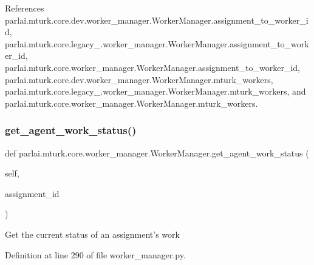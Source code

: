 References parlai.\+mturk.\+core.\+dev.\+worker\+\_\+manager.\+Worker\+Manager.\+assignment\+\_\+to\+\_\+worker\+\_\+id, parlai.\+mturk.\+core.\+legacy\+\_.\+worker\+\_\+manager.\+Worker\+Manager.\+assignment\+\_\+to\+\_\+worker\+\_\+id, parlai.\+mturk.\+core.\+worker\+\_\+manager.\+Worker\+Manager.\+assignment\+\_\+to\+\_\+worker\+\_\+id, parlai.\+mturk.\+core.\+dev.\+worker\+\_\+manager.\+Worker\+Manager.\+mturk\+\_\+workers, parlai.\+mturk.\+core.\+legacy\+\_.\+worker\+\_\+manager.\+Worker\+Manager.\+mturk\+\_\+workers, and parlai.\+mturk.\+core.\+worker\+\_\+manager.\+Worker\+Manager.\+mturk\+\_\+workers.

\mbox{\label{classparlai_1_1mturk_1_1core_1_1worker__manager_1_1WorkerManager_add7bab97c8116b679d516564c9cf0f6d}} 
\subsubsection{\texorpdfstring{get\+\_\+agent\+\_\+work\+\_\+status()}{get\_agent\_work\_status()}}
{\footnotesize\ttfamily def parlai.\+mturk.\+core.\+worker\+\_\+manager.\+Worker\+Manager.\+get\+\_\+agent\+\_\+work\+\_\+status (\begin{DoxyParamCaption}\item[{}]{self,  }\item[{}]{assignment\+\_\+id }\end{DoxyParamCaption})}

\begin{DoxyVerb}Get the current status of an assignment's work\end{DoxyVerb}
 

Definition at line 290 of file worker\+\_\+manager.\+py.



